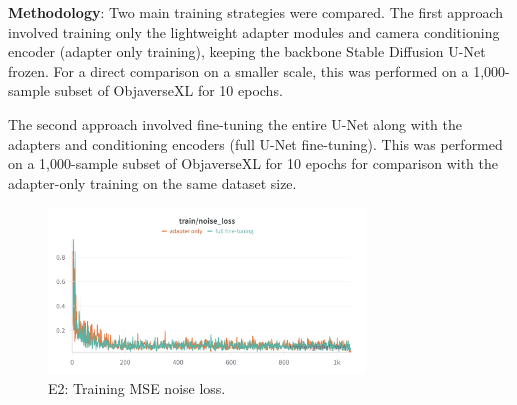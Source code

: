 \textbf{Methodology}:
Two main training strategies were compared. The first approach involved training only the lightweight adapter modules and camera conditioning encoder (adapter only training), keeping the backbone Stable Diffusion U-Net frozen. For a direct comparison on a smaller scale, this was performed on a 1,000-sample subset of ObjaverseXL for 10 epochs.

The second approach involved fine-tuning the entire U-Net along with the adapters and conditioning encoders (full U-Net fine-tuning). This was performed on a 1,000-sample subset of ObjaverseXL for 10 epochs for comparison with the adapter-only training on the same dataset size.

\begin{figure}[htbp]
  \centering
  \includegraphics[width=0.75\textwidth]{images/experiments/adapter_vs_full/train_loss.png}
  \caption{E2: Training MSE noise loss.}
  \label{fig:exp_adap_vs_full_fid}
\end{figure}

